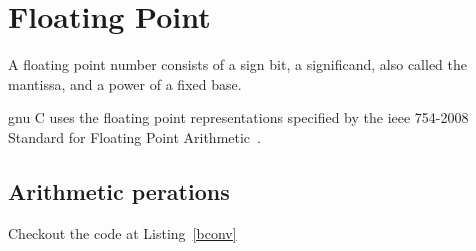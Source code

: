 \section{Floating Point}\label{sec:floating-point}

A floating point number consists of a sign bit, a significand, also called the
mantissa, and a power of a fixed base.

\acrshort{gnu} C uses the floating point representations specified by the
\acrshort{ieee} 754-2008 Standard for Floating Point Arithmetic~\cite{4610935}.



\subsection{Arithmetic perations}

Checkout the code at Listing~\ref{bconv}
